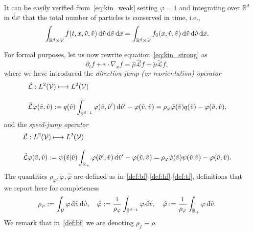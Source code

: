 \documentclass[a4paper]{article}
\theoremstyle{Theorem}\newtheorem{proposition}{Proposition}[section]
\theoremstyle{Remark}\newtheorem{remark}{Remark}[section]
\theoremstyle{Theorem}\newtheorem{theorem}{Theorem}[section]
\newcommand{\R}{\mathbb{R}}
\newcommand{\hv}{\hat{v}}
\newcommand{\tv}{\tilde{v}}
\newcommand{\hphi}{\hat{\varphi}}
\newcommand{\tphi}{\tilde{\varphi}}
\newcommand{\hmu}{\hat{\mu}}
\newcommand{\tmu}{\tilde{\mu}}
\newcommand{\intS}{\int_{\mathbb{S}^{d-1}}}
\newcommand{\intR}{\int_{\R_+}}
\newcommand{\intV}{\int_{\mathcal{V}}}
\begin{document}
It can be easily verified from~\eqref{eq:kin_weak} setting $\varphi=1$ and integrating over $\R^d$ in ${\rm d}x$ that the total number of particles is conserved in time, i.e.,
\begin{equation}\label{mass.cons}
    \int_{\R^d\times\mathcal{V}} f(t,x,\tv,\hv) \, {\rm d} \tv \, {\rm d} \hv \, {\rm d}x = \int_{\R^d\times\mathcal{V}} f_0(x,\tv,\hv) \, {\rm d} \tv \, {\rm d} \hv \, {\rm d}x.
\end{equation}

For formal purposes, let us now rewrite equation~\eqref{eq:kin_strong} as
\begin{equation}\label{eq:kin_strong.2}
\partial_t f +v \cdot \nabla_x f = \hmu \hat{\mathcal{L}}f +  \tmu\tilde{\mathcal{L}}f,   
\end{equation}
where we have introduced the \textit{direction-jump (or reorientation) operator}
\begin{equation*}\label{def:hL}
\begin{aligned}[b]
&\hat{\mathcal{L}}: L^2 (\mathcal{V}) \longmapsto L^2 (\mathcal{V})\\[0.3cm]
&\hat{\mathcal{L}}\varphi(\tv,\hv):=q(\hv)\intS \varphi(\tv,\hv') \, {\rm d}\hv' -\varphi(\tv,\hv) = \rho_\varphi\tphi(\tv) q(\hv) -\varphi(\tv,\hv),
\end{aligned}
\end{equation*}
and the \textit{speed-jump operator}
\begin{equation*}\label{def:tL}
\begin{aligned}[b]
&\tilde{\mathcal{L}}: L^2 (\mathcal{V}) \longmapsto L^2 (\mathcal{V})\\[0.3cm]
&\tilde{\mathcal{L}}\varphi(\tv,\hv):=\psi(\tv|\hv) \intR \varphi(\tv',\hv) \, {\rm d} \tv' - \varphi(\tv,\hv) = \rho_\varphi\hphi(\hv)\psi(\tv|\hv)-\varphi(\tv,\hv). 
  \end{aligned}
\end{equation*}
The quantities $\rho_\varphi, \tphi, \hphi$ are defined as in~\eqref{def:bf}-\eqref{def:hf}-\eqref{def:tf}, definitions that we report here for completeness
\begin{equation}\label{def:bthphi}
    \rho_\varphi:= \intV \varphi \, {\rm d} \tv \, {\rm d} \hv, \quad  \tphi:= \dfrac{1}{\rho_\varphi}\intS \varphi \,  {\rm d} \hv, \quad \hphi:=  \dfrac{1}{\rho_\varphi}\intR \varphi \,  {\rm d} \tv.
\end{equation}
We remark that in~\eqref{def:bf} we are denoting $\rho_f \equiv \rho$. 
\end{document}
